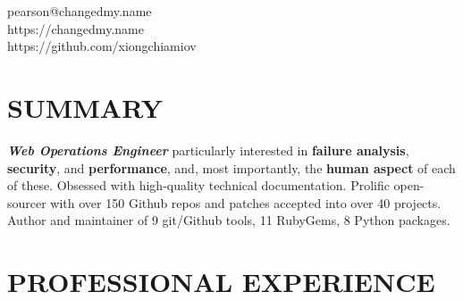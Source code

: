 \documentclass[margin,line]{resume}
\begin{document}
{
    \hfill pearson@changedmy.name           \vspace{0mm}\\\vspace{0mm}%
    \hfill https://changedmy.name           \vspace{0mm}\\\vspace{0mm}%
    \hfill https://github.com/xiongchiamiov \vspace{0mm}\\\vspace{-9mm}%
}

\begin{resume}

    \vspace{-3mm}

    \section{\mysidestyle \textbf{\large{S}\small{UMMARY}}}

    \textbf{\textsl{Web Operations Engineer}} particularly interested in \textbf{failure analysis}, \textbf{security}, and \textbf{performance}, and, most importantly, the \textbf{human aspect} of each of these.  Obsessed with high-quality technical documentation.  Prolific open-sourcer with over 150 Github repos and patches accepted into over 40 projects.  Author and maintainer of 9 git/Github tools, 11 RubyGems, 8 Python packages.

    \vspace{-1mm}

\sectionline

    \section{\mysidestyle \textbf{\large{P}\small{ROFESSIONAL} \large{E}\small{XPERIENCE}}}


\end{resume}
\end{document}
